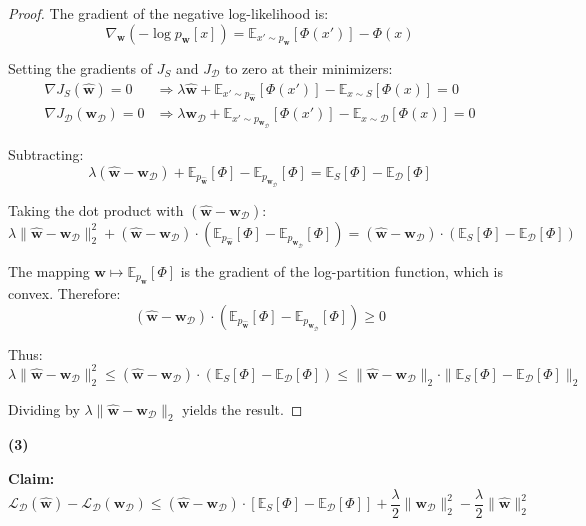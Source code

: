 \documentclass[letterpaper, 11pt]{article}
\newcommand{\1}{\mathds{1}}	%
\theoremstyle{definition}
\begin{document}
\begin{proof}
The gradient of the negative log-likelihood is:
$$\nabla_\mathbf{w}\left(-\log p_\mathbf{w}[x]\right) = \mathbb{E}_{x' \sim p_\mathbf{w}}[\Phi(x')] - \Phi(x)$$

Setting the gradients of $J_S$ and $J_\mathcal{D}$ to zero at their minimizers:
\begin{align*}
\nabla J_S(\widehat{\mathbf{w}}) = 0 &\Rightarrow \lambda\widehat{\mathbf{w}} + \mathbb{E}_{x' \sim p_{\widehat{\mathbf{w}}}}[\Phi(x')] - \mathbb{E}_{x \sim S}[\Phi(x)] = 0 \\
\nabla J_\mathcal{D}(\mathbf{w}_\mathcal{D}) = 0 &\Rightarrow \lambda\mathbf{w}_\mathcal{D} + \mathbb{E}_{x' \sim p_{\mathbf{w}_\mathcal{D}}}[\Phi(x')] - \mathbb{E}_{x \sim \mathcal{D}}[\Phi(x)] = 0
\end{align*}

Subtracting:
$$\lambda(\widehat{\mathbf{w}} - \mathbf{w}_\mathcal{D}) + \mathbb{E}_{p_{\widehat{\mathbf{w}}}}[\Phi] - \mathbb{E}_{p_{\mathbf{w}_\mathcal{D}}}[\Phi] = \mathbb{E}_S[\Phi] - \mathbb{E}_\mathcal{D}[\Phi]$$

Taking the dot product with $(\widehat{\mathbf{w}} - \mathbf{w}_\mathcal{D})$:
$$\lambda\|\widehat{\mathbf{w}} - \mathbf{w}_\mathcal{D}\|_2^2 + (\widehat{\mathbf{w}} - \mathbf{w}_\mathcal{D}) \cdot \left(\mathbb{E}_{p_{\widehat{\mathbf{w}}}}[\Phi] - \mathbb{E}_{p_{\mathbf{w}_\mathcal{D}}}[\Phi]\right) = (\widehat{\mathbf{w}} - \mathbf{w}_\mathcal{D}) \cdot \left(\mathbb{E}_S[\Phi] - \mathbb{E}_\mathcal{D}[\Phi]\right)$$

The mapping $\mathbf{w} \mapsto \mathbb{E}_{p_\mathbf{w}}[\Phi]$ is the gradient of the log-partition function, which is convex. Therefore:
$$(\widehat{\mathbf{w}} - \mathbf{w}_\mathcal{D}) \cdot \left(\mathbb{E}_{p_{\widehat{\mathbf{w}}}}[\Phi] - \mathbb{E}_{p_{\mathbf{w}_\mathcal{D}}}[\Phi]\right) \geq 0$$

Thus:
$$\lambda\|\widehat{\mathbf{w}} - \mathbf{w}_\mathcal{D}\|_2^2 \leq (\widehat{\mathbf{w}} - \mathbf{w}_\mathcal{D}) \cdot \left(\mathbb{E}_S[\Phi] - \mathbb{E}_\mathcal{D}[\Phi]\right) \leq \|\widehat{\mathbf{w}} - \mathbf{w}_\mathcal{D}\|_2 \cdot \|\mathbb{E}_S[\Phi] - \mathbb{E}_\mathcal{D}[\Phi]\|_2$$

Dividing by $\lambda\|\widehat{\mathbf{w}} - \mathbf{w}_\mathcal{D}\|_2$ yields the result.
\end{proof}

\textbf{(3)}

\textbf{Claim:}
$$\mathcal{L}_\mathcal{D}(\widehat{\mathbf{w}}) - \mathcal{L}_\mathcal{D}(\mathbf{w}_\mathcal{D}) \leq (\widehat{\mathbf{w}} - \mathbf{w}_\mathcal{D}) \cdot \left[\mathbb{E}_S[\Phi] - \mathbb{E}_\mathcal{D}[\Phi]\right] + \frac{\lambda}{2}\|\mathbf{w}_\mathcal{D}\|_2^2 - \frac{\lambda}{2}\|\widehat{\mathbf{w}}\|_2^2$$
\end{document}
